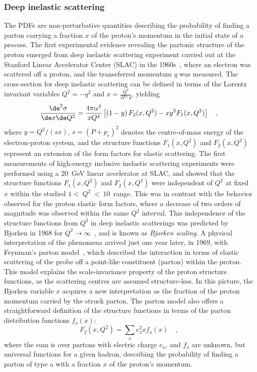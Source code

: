 \subsubsection{Deep inelastic scattering}
The PDFs are non-perturbative quantities describing the probability of finding a parton carrying a fraction $x$ of the proton's momentum in the initial state of a process. The first experimental evidence revealing the partonic structure of the proton emerged from deep inelastic scattering experiment carried out at the Stanford Linear Accelerator Center (SLAC) in the 1960s~\cite{Friedman:1972sy}, where an electron was scattered off a proton, and the transeferred momentum $q$ was measured. The cross-section for deep inelastic scattering can be defined in terms of the Lorentz invariant variables $Q^2 = -q^2$ and $x = \frac{Q^2}{2P\cdot q}$, yielding
\begin{equation*}
    \frac{\de^2\sigma}{\de x \de Q^2} = \frac{4\pi\alpha^2}{xQ^4} \left[ \left(1-y\right)F_2(x,Q^2) - xy^2F_1(x,Q^2) \right]\quad ,
\end{equation*}
where $y=Q^2/(sx)$, $s = (P+p_\mathrm{e})^2$ denotes the centre-of-mass energy of the electron-proton system, and the structure functions $F_1(x,Q^2)$ and $F_2(x,Q^2)$ represent an extension of the form factors for elastic scattering.
The first measurements of high-energy inclusive inelastic scattering experiments were performed using a 20~GeV linear accelerator at SLAC, and showed that the structure functions $F_1(x,Q^2)$ and $F_2(x,Q^2)$ were independent of $Q^2$ at fixed $x$ within the studied $1<~Q^2~<~10$~\gevcc range. This was in contrast with the behavior observed for the proton elastic form factors, where a decrease of two orders of magnitude was observed within the same $Q^2$ interval. This independence of the structure functions from $Q^2$ in deep inelastic scatterings was predicted by Bjorken in 1968 for $Q^2 \rightarrow \infty$~\cite{Bjorken:1968dy}, and is known as \emph{Bjorken scaling}. A physical interpretation of the phenomena arrived just one year later, in 1969, with Feynman's parton model~\cite{Feynman:1969ej}, which described the interaction in terms of elastic scattering of the probe off a point-like constituent (parton) within the proton. This model explains the scale-invariance property of the proton structure functions, as the scattering centres are assumed structure-less. In this picture, the Bjorken variable $x$ acquires a new interpretation as the fraction of the proton momentum carried by the struck parton. The parton model also offers a straightforward definition of the structure functions in terms of the parton distribution functions $f_\mathrm{a}(x)$:
\begin{equation*}
    F_2(x,Q^2) = \sum_\mathrm{a} e_\mathrm{a}^2 x f_\mathrm{a}(x)\quad ,
\end{equation*}
where the sum is over partons with electric charge $e_\mathrm{a}$, and $f_\mathrm{a}$ are unknown, but universal functions for a given hadron, describing the probability of finding a parton of type a with a fraction $x$ of the proton's momentum. 

